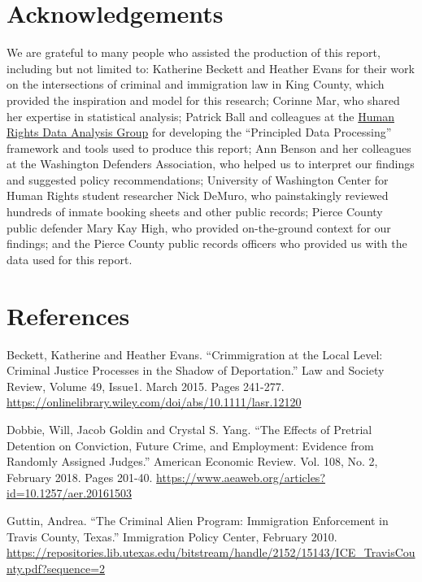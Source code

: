 \documentclass[12pt]{report}\usepackage[]{graphicx}\usepackage[]{color}
\begin{document}
\newpage
\section*{Acknowledgements}

We are grateful to many people who assisted the production of this report, including but not limited to: Katherine Beckett and Heather Evans for their work on the intersections of criminal and immigration law in King County, which provided the inspiration and model for this research; Corinne Mar, who shared her expertise in statistical analysis; Patrick Ball and colleagues at the \href{https://hrdag.org/}{Human Rights Data Analysis Group} for developing the ``Principled Data Processing'' framework and tools used to produce this report; Ann Benson and her colleagues at the Washington Defenders Association, who helped us to interpret our findings and suggested policy recommendations; University of Washington Center for Human Rights student researcher Nick DeMuro, who painstakingly reviewed hundreds of inmate booking sheets and other public records; Pierce County public defender Mary Kay High, who provided on-the-ground context for our findings; and the Pierce County public records officers who provided us with the data used for this report.

\section*{References}

\raggedright

Beckett, Katherine and Heather Evans. ``Crimmigration at the Local Level: Criminal Justice Processes in the Shadow of Deportation.'' Law and Society Review, Volume 49, Issue1. March 2015. Pages 241-277. \url{https://onlinelibrary.wiley.com/doi/abs/10.1111/lasr.12120}

\vspace{4mm}

Dobbie, Will, Jacob Goldin and Crystal S. Yang. ``The Effects of Pretrial Detention on Conviction, Future Crime, and Employment: Evidence from Randomly Assigned Judges.'' American Economic Review. Vol. 108, No. 2, February 2018. Pages 201-40. \url{https://www.aeaweb.org/articles?id=10.1257/aer.20161503}

\vspace{4mm}

Guttin, Andrea. ``The Criminal Alien Program: Immigration Enforcement in Travis County, Texas.'' Immigration Policy Center, February 2010. \newline \url{https://repositories.lib.utexas.edu/bitstream/handle/2152/15143/ICE_TravisCounty.pdf?sequence=2}
\end{document}
